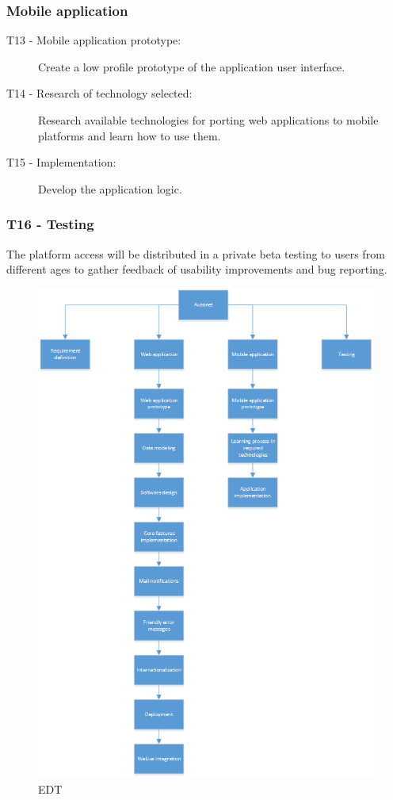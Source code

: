 \documentclass{DeustoFDP}
\begin{document}
\subsubsection{Mobile application}
\begin{description}
	\item[T13 - Mobile application prototype:] Create a low profile prototype of the application user interface.
	\item[T14 - Research of technology selected:] Research available technologies for porting web applications to mobile platforms and learn how to use them.
	\item[T15 - Implementation:] Develop the application logic.
\end{description}

\subsubsection{T16 - Testing}
The platform access will be distributed in a private beta testing to users from different ages to gather feedback of usability improvements and bug reporting. 

\newpage
\begin{figure}[H]
\centering
\includegraphics[width=0.9\linewidth]{fig/EDT}
\caption[EDT]{EDT}
\label{fig:EDT}
\end{figure}
\end{document}
